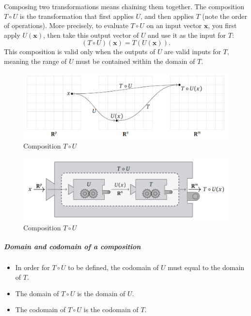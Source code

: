 \documentclass[a4paper,12pt]{article}
\begin{document}
Composing two transformations means chaining them together. The composition \( T \circ U \) is the transformation that first applies \( U \), and then applies \( T \) (note the order of operations). More precisely, to evaluate \( T \circ U \) on an input vector \( \mathbf{x} \), you first apply \( U(\mathbf{x}) \), then take this output vector of \( U \) and use it as the input for \( T \):
\[
(T \circ U)(\mathbf{x}) = T(U(\mathbf{x})).
\]
This composition is valid only when the outputs of \( U \) are valid inputs for \( T \), meaning the range of \( U \) must be contained within the domain of \( T \).

\begin{figure}[H]
    \centering
    \includegraphics[width=1\linewidth]{CompositionofLT.png}
    \caption{Composition \(T \circ U\)}
    \label{fig:colt}
\end{figure}
\begin{figure}[H]
    \centering
    \includegraphics[width=1\linewidth]{coltasmachine.png}
    \caption{Composition \(T \circ U\)}
    \label{fig:colt-as-machine}
\end{figure}

\subparagraph{Domain and codomain of a composition}
\begin{itemize}
    \item In order for \(T \circ U\) to be defined, the codomain of $U$ must equal to the domain of $T$.
    \item The domain of \(T \circ U\) is the domain of $U$.
    \item The codomain of  \(T \circ U\) is the codomain of $T$.
\end{itemize}
\end{document}
